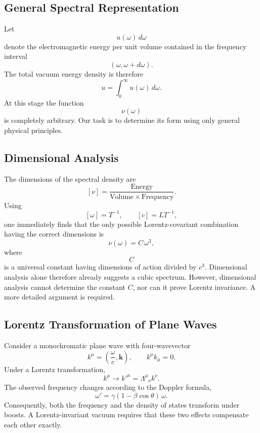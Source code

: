 \subsection{General Spectral Representation}
Let
\[u(\omega)\,d\omega\]
denote the electromagnetic energy per unit volume contained in the
frequency interval
\[(\omega,\omega+d\omega).\]
The total vacuum energy density is therefore
\begin{equation}
u=\int_0^\infty u(\omega)\,d\omega.
\end{equation}
At this stage the function
\[\nu(\omega)\]
is completely arbitrary.
Our task is to determine its form using only general physical
principles.
\subsection{Dimensional Analysis}
The dimensions of the spectral density are
\[[\nu]=\frac{\mathrm{Energy}}{\mathrm{Volume}\times\mathrm{Frequency}}.\]
Using
\[[\omega]=T^{-1},\qquad[c]=LT^{-1},\]
one immediately finds that the only possible Lorentz-covariant
combination having the correct dimensions is
\begin{equation}
\nu(\omega)=C\,\omega^3,
\end{equation}
where
\[C\]
is a universal constant having dimensions of action divided by
\(c^3\).
Dimensional analysis alone therefore already suggests a cubic spectrum.
However, dimensional analysis cannot determine the constant
\(C\), nor can it prove Lorentz invariance.
A more detailed argument is required.
\subsection{Lorentz Transformation of Plane Waves}
Consider a monochromatic plane wave with four-wavevector
\[k^\mu=\left(\frac{\omega}{c},\mathbf k\right),\qquad k^\mu k_\mu=0.\]
Under a Lorentz transformation,
\[k^\mu\longrightarrow k'^\mu=\Lambda^\mu{}_\nu k^\nu .\]
The observed frequency changes according to the Doppler formula,
\begin{equation}
\omega'=\gamma(1-\beta\cos\theta)\,\omega .
\label{eq:Doppler}
\end{equation}
Consequently,
both the frequency and the density of states transform under boosts.
A Lorentz-invariant vacuum requires that these two effects compensate
each other exactly.
